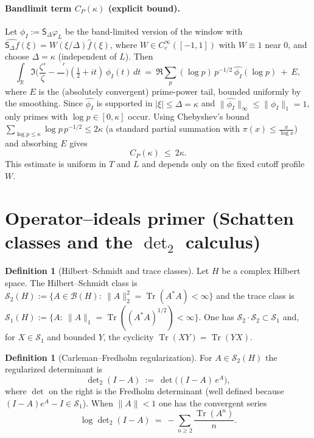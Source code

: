 \documentclass[11pt]{article}
\theoremstyle{definition}
\newtheorem{definition}[theorem]{Definition}
\theoremstyle{remark}
\newcommand{\R}{\mathbb{R}}
\DeclareMathOperator{\Tr}{Tr}
\DeclareMathOperator{\dettwo}{det_2}
\begin{document}

\paragraph{Bandlimit term $C_P(\kappa)$ (explicit bound).}
Let $\phi_I:=\mathsf S_\Delta\varphi_L$ be the band-limited version of the window with $\widehat{\mathsf S_\Delta f}(\xi)=W(\xi/\Delta)\widehat f(\xi)$, where $W\in C_c^\infty([-1,1])$ with $W\equiv 1$ near $0$, and choose $\Delta=\kappa$ (independent of $L$). Then
\[
 \int_{\R}\Im\Big(\frac{\zeta'}{\zeta}-\frac{\dettwo'}{\dettwo}\Big)\!(\tfrac12+it)\,\phi_I(t)\,dt\ =\ \Re\sum_{p}(\log p)\,p^{-1/2}\,\widehat{\phi_I}(\log p)\ +\ E,
\]
where $E$ is the (absolutely convergent) prime-power tail, bounded uniformly by the smoothing. Since $\widehat{\phi_I}$ is supported in $|\xi|\le \Delta=\kappa$ and $\|\widehat{\phi_I}\|_\infty\le\|\phi_I\|_1=1$, only primes with $\log p\in[0,\kappa]$ occur. Using Chebyshev's bound $\sum_{\log p\le \kappa}\log p\,p^{-1/2}\le 2\kappa$ (a standard partial summation with $\pi(x)\le \tfrac{x}{\log x}$) and absorbing $E$ gives
\[
 C_P(\kappa)\ \le\ 2\kappa.
\]
This estimate is uniform in $T$ and $L$ and depends only on the fixed cutoff profile $W$.

\section{Operator--ideals primer (Schatten classes and the $\det_2$ calculus)}\label{sec:operator-ideals-primer}

\begin{definition}[Hilbert--Schmidt and trace classes]\label{def:S2S1}
Let $H$ be a complex Hilbert space. The Hilbert--Schmidt class is $\mathcal S_2(H):=\{A\in\mathcal B(H):\ \|A\|_2^2=\Tr(A^*A)<\infty\}$ and the trace class is $\mathcal S_1(H):=\{A:\ \|A\|_1=\Tr((A^*A)^{1/2})<\infty\}$. One has $\mathcal S_2\cdot\mathcal S_2\subset\mathcal S_1$ and, for $X\in\mathcal S_1$ and bounded $Y$, the cyclicity $\Tr(XY)=\Tr(YX)$.
\end{definition}

\begin{definition}[Carleman--Fredholm regularization]\label{def:det2-cf}
For $A\in\mathcal S_2(H)$ the regularized determinant is
\[
  \det\nolimits_2(I-A)\ :=\ \det\big((I-A)\,e^{A}\big),
\]
where $\det$ on the right is the Fredholm determinant (well defined because $(I-A)e^A-I\in\mathcal S_1$). When $\|A\|<1$ one has the convergent series
\[
  \log\det\nolimits_2(I-A)\ =\ -\sum_{n\ge 2}\frac{\Tr(A^n)}{n}.
\]
\end{definition}
\end{document}

